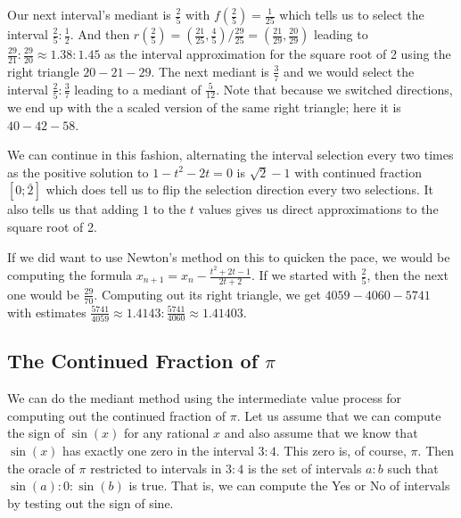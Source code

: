 \documentclass[12pt]{article}
\begin{document}
Our next interval's mediant is $\frac{2}{5}$ with $f(\frac{2}{5}) = \frac{1}{25}$ which tells us to select the interval $\frac{2}{5}:\frac{1}{2}$. And then $r(\frac{2}{5}) = (\frac{21}{25}, \frac{4}{5})/\frac{29}{25} = (\frac{21}{29}, \frac{20}{29})$ leading to $\frac{29}{21}:\frac{29}{20} \approx 1.38: 1.45$ as the interval approximation for the square root of 2 using the right triangle $20-21-29$. The next mediant is $\frac{3}{7}$ and we would select the interval $\frac{2}{5}:\frac{3}{7}$ leading to a mediant of $\frac{5}{12}$.  Note that because we switched directions, we end up with the a scaled version of the same right triangle; here it is $40-42-58$. 

We can continue in this fashion, alternating the interval selection every two times as the positive solution to $1 - t^2 - 2t = 0$ is $\sqrt{2}-1$ with continued fraction $[0;\bar{2}]$ which does tell us to flip the selection direction every two selections. It also tells us that adding $1$ to the $t$ values gives us direct approximations to the square root of 2. 

If we did want to use Newton's method on this to quicken the pace, we would be computing the formula $x_{n+1} = x_n - \frac{ t^2  + 2t -1}{2t + 2}$. If we started with $\frac{2}{5}$, then the next one would be $\frac{29}{70}$. Computing out its right triangle, we get $4059-4060-5741$ with estimates $\frac{5741}{4059}\approx 1.4143: \frac{5741}{4060} \approx 1.41403$. 

\subsection{The Continued Fraction of \texorpdfstring{$\pi$}{pi}}

We can do the mediant method using the intermediate value process for computing out the continued fraction of $\pi$. Let us assume that we can compute the sign of $\sin(x)$ for any rational $x$ and also assume that we know that $\sin(x)$ has exactly one zero in the interval $3:4$. This zero is, of course, $\pi$. Then the oracle of $\pi$ restricted to intervals in $3:4$ is the set of intervals $a:b$ such that $\sin(a):0:\sin(b)$ is true. That is, we can compute the Yes or No of intervals by testing out the sign of sine. 
\end{document}
